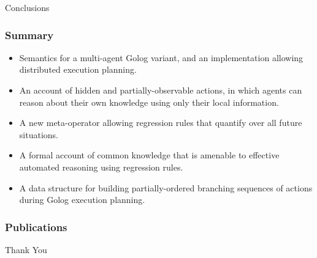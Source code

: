 \documentclass{beamer}
\begin{document}
\begin{frame}
\centering \large Conclusions\\
\end{frame}


\begin{frame}
  \frametitle{Summary}
  \begin{itemize}
  \item Semantics for a multi-agent Golog variant, and an implementation allowing distributed execution planning.
  \item An account of hidden and partially-observable actions, in which agents can reason about their own knowledge using only their local information.
  \item A new meta-operator allowing regression rules that quantify over all future situations.
  \item A formal account of common knowledge that is amenable to effective automated reasoning using regression rules.
  \item A data structure for building partially-ordered branching sequences of actions during Golog execution planning.
  \end{itemize}
\end{frame}

\begin{frame}
\frametitle{Publications}
\small
\nocite{kelly06hlp_dps}
\nocite{kelly07sc_persistence}
\nocite{kelly07sc_know_obs}
\nocite{kelly08complex_epistemic_modalities}


\normalsize
\end{frame}

\begin{frame}
\centering \large Thank You\\
\end{frame}
\end{document}
